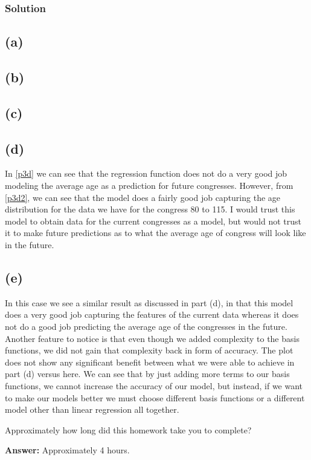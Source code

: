 \documentclass[submit]{harvardml}
\begin{document}
\subsubsection*{Solution}
\subsection*{(a)}

\subsection*{(b)}

\subsection*{(c)}

\subsection*{(d)}
In \cref{p3d} we can see that the regression function does not do a very good job modeling the average age as a prediction for future congresses. However, from \cref{p3d2}, we can see that the model does a fairly good job capturing the age distribution for the data we have for the congress 80 to 115. I would trust this model to obtain data for the current congresses as a model, but would not trust it to make future predictions as to what the average age of congress will look like in the future.

\subsection*{(e)}
In this case we see a similar result as discussed in part (d), in that this model does a very good job capturing the features of the current data whereas it does not do a good job predicting the average age of the congresses in the future. Another feature to notice is that even though we added complexity to the basis functions, we did not gain that complexity back in form of accuracy. The plot does not show any significant benefit between what we were able to achieve in part (d) versus here. We can see that by just adding more terms to our basis functions, we cannot increase the accuracy of our model, but instead, if we want to make our models better we must choose different basis functions or a different model other than linear regression all together.

\newpage
\begin{problem}[Calibration, 1pt]
Approximately how long did this homework take you to complete?
\end{problem}
\textbf{Answer:}
Approximately 4 hours.
\end{document}
